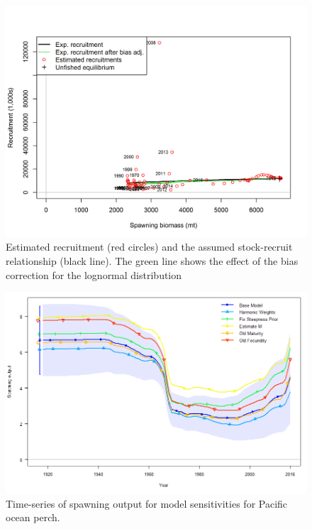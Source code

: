 \documentclass[12pt,]{article}
\begin{document}
\FloatBarrier

\begin{figure}
\centering
\includegraphics{r4ss/plots_mod1/SR_curve2.png}
\caption{Estimated recruitment (red circles) and the assumed
stock-recruit relationship (black line). The green line shows the effect
of the bias correction for the lognormal distribution
\label{fig:stock_recruit_curve}}
\end{figure}

\begin{figure}
\centering
\includegraphics{Figures/ssb_sens1.png}
\caption{Time-series of spawning output for model sensitivities for
Pacific ocean perch. \label{fig:sens1_ssb}}
\end{figure}

\FloatBarrier
\end{document}
